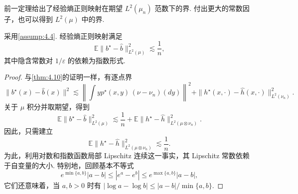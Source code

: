 前一定理给出了经验熵正则映射在期望 $L^2(\mu_n)$ 范数下的界. 付出更大的常数因子，也可以得到 $L^2(\mu)$ 中的界.
\begin{theorem}\label{thm:4.11}
采用\autoref{assump:4.4}. 经验熵正则映射满足
$$\mathbb E\|b^\star-\widehat b\|_{L^2(\mu)}^2\lesssim\frac1n,$$
其中隐含常数对 $1/\varepsilon$ 的依赖为指数形式.
\end{theorem}
\begin{proof}
与\autoref{thm:4.10}的证明一样，有逐点界
$$\|b^\star(x)-\widehat b(x)\|^2
\lesssim\left\|\int yp^\star(x,y)\,(\nu-\nu_n)(dy)\right\|^2
+\|h^\star(x,\cdot)-\widehat h(x,\cdot)\|_{L^2(\nu_n)}^2.$$
关于 $\mu$ 积分并取期望，得到
$$\mathbb E\|b^\star-\widehat b\|_{L^2(\mu)}^2
\lesssim\frac1n+\mathbb E\|h^\star-\widehat h\|_{L^2(\mu\otimes\nu_n)}^2.$$
因此，只需建立
\begin{equation}\label{eq:4.25}
\mathbb E\|h^\star-\widehat h\|_{L^2(\mu\otimes\nu_n)}^2\lesssim\frac1n.
\end{equation}
为此，利用对数和指数函数局部 Lipschitz 连续这一事实，其 Lipschitz 常数依赖于自变量的大小. 特别地，回顾基本不等式
$$e^{\min\{a,b\}}|a-b|\le|e^a-e^b|\le e^{\max\{a,b\}}|a-b|,$$
它们还意味着，当 $a,b>0$ 时有 $|\log a-\log b|\le|a-b|/\min\{a,b\}$.


\end{proof}

